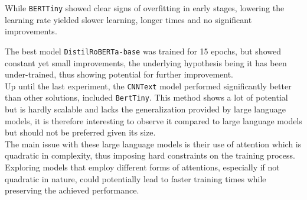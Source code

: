 \documentclass[11pt]{article}
\begin{document}
While \texttt{BERTTiny} showed clear signs of overfitting in early stages, lowering the learning rate yielded slower learning, longer times and no significant improvements.

The best model \texttt{DistilRoBERTa-base} was trained for 15 epochs, but showed constant yet small improvements, the underlying hypothesis being it has been under-trained, thus showing potential for further improvement. \\

Up until the last experiment, the \texttt{CNNText} model performed significantly better than other solutions, included \texttt{BertTiny}. This method shows a lot of potential but is hardly scalable and lacks the generalization provided by large language models, it is therefore interesting to observe it compared to large language models but should not be preferred given its size. \\

The main issue with these large language models is their use of attention which is quadratic in complexity, thus imposing hard constraints on the training process. Exploring models that employ different forms of attentions, especially if not quadratic in nature, could potentially lead to faster training times while preserving the achieved performance.


\end{document}
